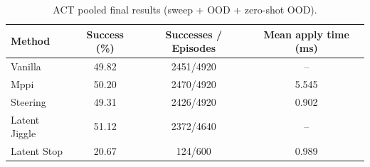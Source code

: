 \begin{table}[t]
\centering
\caption{ACT pooled final results (sweep + OOD + zero-shot OOD).}
\label{tab:act_final_pooled}
\begin{tabular}{lccc}
\toprule
Method & Success (\%) & Successes / Episodes & Mean apply time (ms) \\
\midrule
Vanilla & 49.82 & 2451/4920 & -- \\
Mppi & 50.20 & 2470/4920 & 5.545 \\
Steering & 49.31 & 2426/4920 & 0.902 \\
Latent Jiggle & 51.12 & 2372/4640 & -- \\
Latent Stop & 20.67 & 124/600 & 0.989 \\
\bottomrule
\end{tabular}
\end{table}
